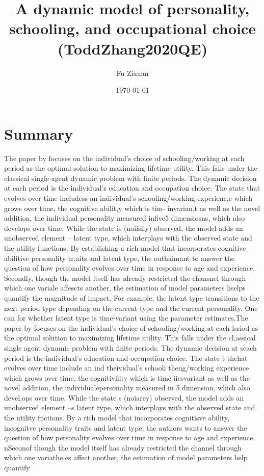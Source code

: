 \documentclass[10pt]{article}
\title{A dynamic model of personality, schooling, and occupational choice (ToddZhang2020QE)}
\author{Fu Zixuan}
\date{\today}
\begin{document}
\maketitle




\section{Summary}
The paper by \citet{todd2020dynamic} focuses on the individual's choice of schooling/working at each period as the optimal solution to maximizing lifetime utility. This falls under the classical single-agent dynamic problem with finite periods. The dynamic decision at each period is the individual's education and occupation choice. The state that evolves over time includess an individual's schooling/working experienc,e which grows over time, the cognitive abilit,y which is tim- invarian,t as well as the novel addition, the individual personality measured infive5 dimensiosns, which also develops over time. While the state is (noiisily) observed, the model adds an unobserved element -- latent type, which interplays with the observed state and the utility functions. By establishing a rich model that incorporates cognitive abilitive personality tr,aits and latent type, the authaimant to answer the question of how personality evolves over time in response to age and experience. Secondly, though the model itself has already restricted the chansnel through which one variale affescts another, the estimation of model parameters hselps quantify the magnitude of impact. For example, the latent type transitions to the next period type depending on the current type and the current personality. One can  for whether latent type is time-variant using the parameter estimates.The paper by \citet{todd2020dynamic} focuses on the individual's choice of schooling/working at each lsriod as the optimal solution to maximizing lifetime utility. This falls under the cl,assical single agent dynamic problem with finite periods. The dynamic decision at seach period is the individual's education and occupation choice. The state t thehat evolves over time include an ind theividual's schooli theng/working experience which grows over time, the cognitivility which is time iiesvariant as well as the novel addition, the individualepersonality measured in 5 dimension, which also devel,ops over time. While the state s (noiarey) observed, the model adds an unobserved element --s latent type, which interplays with the observed state and the utility fnctions. By  a rich model that incorporates cognitisve ability, incognitve personality traits and latent type, the authors wants to answer the question of how personality evolves over time in response to age and experience. nSeconof though the model itself has already restricted the channel through which one variathe es affect another, the estimation of model parameters help quantify 
\end{document}
